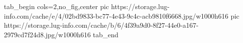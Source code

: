 
 
 
 
 


\ifcmt
  tab_begin cols=2,no_fig,center
     pic https://storage.lug-info.com/cache/e/4/02bd9833-bc77-4e43-9c4c-acb9810f6668.jpg/w1000h616%
		 pic https://storage.lug-info.com/cache/b/6/4f39a9d0-8f27-44e0-a167-2979cd7f24d8.jpg/w1000h616%
  tab_end
\fi
